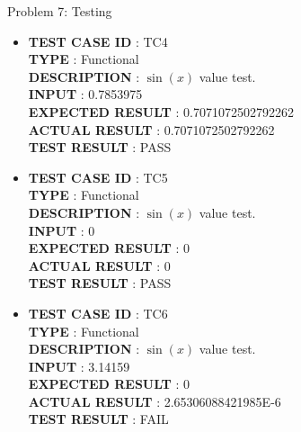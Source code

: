 \documentclass[a4paper,12pt]{article}
\begin{document}
\begin{section}{Problem 7: Testing}
\begin{itemize}
\item \textbf{TEST CASE ID} \hspace{1.25cm} : TC4  \\
\textbf{TYPE } \hspace{3.15cm}  : Functional\\
\textbf{DESCRIPTION }\hspace{1.25cm} : $\sin(x)$ value test. \\
\textbf{INPUT} \hspace{3.05cm} :  0.7853975 \\
\textbf{EXPECTED RESULT} \hspace{0.01cm} : 0.7071072502792262 \\
\textbf{ACTUAL RESULT} \hspace{0.6cm} : 0.7071072502792262 \\
\textbf{TEST RESULT} \hspace{1.40cm} : PASS \\

\item \textbf{TEST CASE ID} \hspace{1.25cm} : TC5  \\
\textbf{TYPE } \hspace{3.15cm}  : Functional\\
\textbf{DESCRIPTION }\hspace{1.25cm} : $\sin(x)$ value test. \\
\textbf{INPUT} \hspace{3.05cm} :  0 \\
\textbf{EXPECTED RESULT} \hspace{0.01cm} : 0 \\
\textbf{ACTUAL RESULT} \hspace{0.6cm} : 0 \\
\textbf{TEST RESULT} \hspace{1.40cm} : PASS \\	

\item \textbf{TEST CASE ID} \hspace{1.25cm} : TC6  \\
\textbf{TYPE } \hspace{3.15cm}  : Functional\\
\textbf{DESCRIPTION }\hspace{1.25cm} : $\sin(x)$ value test. \\
\textbf{INPUT} \hspace{3.05cm} :  3.14159 \\
\textbf{EXPECTED RESULT} \hspace{0.01cm} : 0 \\
\textbf{ACTUAL RESULT} \hspace{0.6cm} : 2.65306088421985E-6 \\
\textbf{TEST RESULT} \hspace{1.40cm} : FAIL \\



\end{itemize}
\end{section}
\end{document}
